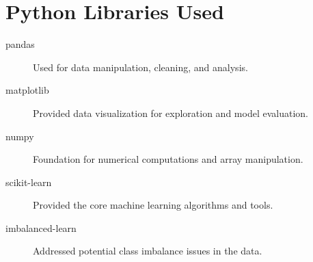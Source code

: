 \section{Python Libraries Used}

\begin{description}
    \item[pandas] Used for data manipulation, cleaning, and analysis.
    \item[matplotlib] Provided data visualization for exploration and model
    evaluation.
    \item[numpy] Foundation for numerical computations and array manipulation.
    \item[scikit-learn] Provided the core machine learning algorithms and tools.
    \item[imbalanced-learn] Addressed potential class imbalance issues in the
    data.
\end{description}
